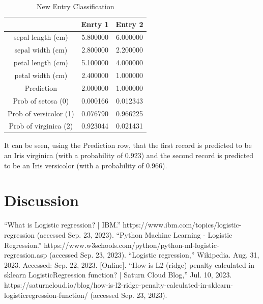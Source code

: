 \documentclass[journal]{IEEEtran}
\begin{document}
\begin{table}[h!]
\centering
\begin{tabular}{ c | c c }
 & Enrty 1 &	Entry 2 \\ 
\hline
sepal length (cm)	& 5.800000	& 6.000000 \\
sepal width (cm)	& 2.800000	& 2.200000 \\
petal length (cm)	& 5.100000	& 4.000000 \\
petal width (cm)	& 2.400000	& 1.000000 \\
Prediction	& 2.000000	& 1.000000 \\
Prob of setosa (0)	& 0.000166	& 0.012343 \\
Prob of versicolor (1)	& 0.076790	& 0.966225 \\
Prob of virginica (2)	& 0.923044	& 0.021431
\end{tabular}
\caption{New Entry Classification}
\label{table:new-entry-table}
\end{table}

It can be seen, using the Prediction row, that the first record is predicted to be an Iris virginica (with a probability of 0.923) and the second record is predicted to be an Iris versicolor (with a probability of 0.966).

\section{Discussion}



\begin{thebibliography}{00}
“What is Logistic regression? | IBM.” https://www.ibm.com/topics/logistic-regression (accessed Sep. 23, 2023).
“Python Machine Learning - Logistic Regression.” https://www.w3schools.com/python/python-ml-logistic-regression.asp (accessed Sep. 23, 2023).
“Logistic regression,” Wikipedia. Aug. 31, 2023. Accessed: Sep. 22, 2023. [Online].
“How is L2 (ridge) penalty calculated in sklearn LogisticRegression function? | Saturn Cloud Blog,” Jul. 10, 2023. https://saturncloud.io/blog/how-is-l2-ridge-penalty-calculated-in-sklearn-logisticregression-function/ (accessed Sep. 23, 2023).

\end{thebibliography}
\end{document}
